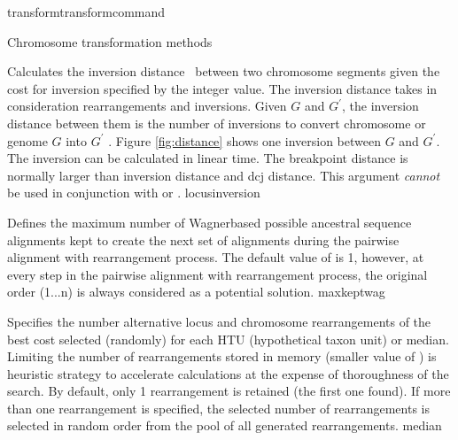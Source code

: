 \begin{command}{transform}{transformcommand}
\begin{arguments}
\begin{argumentgroup}{Chromosome transformation methods}
\begin{description}
                    {Calculates the inversion distance~\cite{hanenhalliandpevzner1995}
                    between two chromosome segments given the cost for inversion
                    specified by the integer value. The inversion distance
                    takes in consideration rearrangements and
                    inversions. Given $G$ and $G^\prime$, the inversion distance between
                    them is the number of inversions to convert chromosome or genome $G$ 
                    into $G^\prime$ \cite{hanenhalliandpevzner1995}. Figure \ref{fig:distance} shows one inversion  
                    between $G$ and $G^\prime$. The inversion can be calculated in linear time.
                    The breakpoint distance is normally larger than
                    inversion distance  and dcj distance.
                    This argument \emph{cannot} be used in conjunction with
                     or .} 
                    {locusinversion}  

                    {Defines the maximum number of Wagner\-based possible ancestral sequence
                    alignments kept to create the next set of alignments during the pairwise alignment
                    with rearrangement process.  The default value of  is 1,
                    however, at every step in the pairwise alignment with rearrangement process, the original
                    order (1...n) is always considered as a potential solution.}
                    {maxkeptwag}
       		      
                    {Specifies the number alternative locus and chromosome
                    rearrangements of the best cost selected (randomly) for
                    each HTU (hypothetical taxon unit) or median. Limiting the number of rearrangements
                    stored in memory (smaller value of )
                    is heuristic strategy to accelerate calculations at the
                    expense of thoroughness of the search. By default, only 1
                    rearrangement is retained (the first one found). If more than
                    one rearrangement is specified, the selected number of
                    rearrangements is selected in random order from the pool of
                    all generated rearrangements.}
                    {median}


\end{description}
\end{argumentgroup}
\end{arguments}
\end{command}
